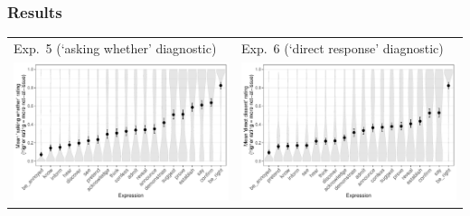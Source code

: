 \documentclass[compress, xcolor = dvipsnames, aspectratio=169]{beamer}
\begin{document}
	\begin{frame}[t]\frametitle{Results}\scriptsize
		\begin{minipage}{\textwidth}
	      \centering
	      \begin{tabular}{p{.48\linewidth} p{.48\linewidth}}
	      	Exp.~5 (`asking whether' diagnostic)
	      	&
	      	Exp.~6 (`direct response' diagnostic)\\ 
	      	\includegraphics[width=\linewidth]{../../results/exp5/graphs/mean-ratings.pdf}%
	      	&
	      	\includegraphics[width=\linewidth]{../../results/exp6/graphs/mean-ratings.pdf}
	      	\\
	      \end{tabular}
	    \end{minipage}


\end{frame}
\end{document}
